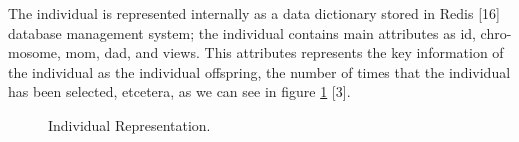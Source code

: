 The individual is represented internally as a data dictionary stored in Redis
[16] database management system; the individual contains main attributes as id,
chro-mosome, mom, dad, and views. This attributes represents the key information
of the individual as the individual offspring, the number of times that the
individual has been selected, etcetera, as we can see in figure \ref{fig:individualRep} [3].

\begin{figure}
	\captionsetup{justification=centering,margin=2cm}
	\centering
	\setlength\fboxsep{0pt}
	\setlength\fboxrule{0.7pt}
	\caption{Individual Representation.}
	\label{fig:individualRep}
\end{figure}

